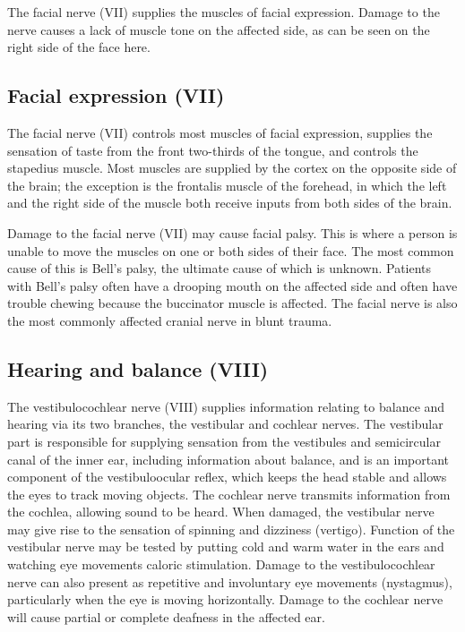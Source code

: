 The facial nerve (VII) supplies the muscles of facial expression. Damage to the nerve causes a lack of muscle tone on the affected side, as can be seen on the right side of the face here.

\hypertarget{facial-expression-vii}{%
\subsection{Facial expression (VII)}\label{facial-expression-vii}}

The facial nerve (VII) controls most muscles of facial expression, supplies the sensation of taste from the front two-thirds of the tongue, and controls the stapedius muscle. Most muscles are supplied by the cortex on the opposite side of the brain; the exception is the frontalis muscle of the forehead, in which the left and the right side of the muscle both receive inputs from both sides of the brain.

Damage to the facial nerve (VII) may cause facial palsy. This is where a person is unable to move the muscles on one or both sides of their face. The most common cause of this is Bell's palsy, the ultimate cause of which is unknown. Patients with Bell's palsy often have a drooping mouth on the affected side and often have trouble chewing because the buccinator muscle is affected. The facial nerve is also the most commonly affected cranial nerve in blunt trauma.

\hypertarget{hearing-and-balance-viii}{%
\subsection{Hearing and balance (VIII)}\label{hearing-and-balance-viii}}

The vestibulocochlear nerve (VIII) supplies information relating to balance and hearing via its two branches, the vestibular and cochlear nerves. The vestibular part is responsible for supplying sensation from the vestibules and semicircular canal of the inner ear, including information about balance, and is an important component of the vestibuloocular reflex, which keeps the head stable and allows the eyes to track moving objects. The cochlear nerve transmits information from the cochlea, allowing sound to be heard. When damaged, the vestibular nerve may give rise to the sensation of spinning and dizziness (vertigo). Function of the vestibular nerve may be tested by putting cold and warm water in the ears and watching eye movements caloric stimulation. Damage to the vestibulocochlear nerve can also present as repetitive and involuntary eye movements (nystagmus), particularly when the eye is moving horizontally. Damage to the cochlear nerve will cause partial or complete deafness in the affected ear.


